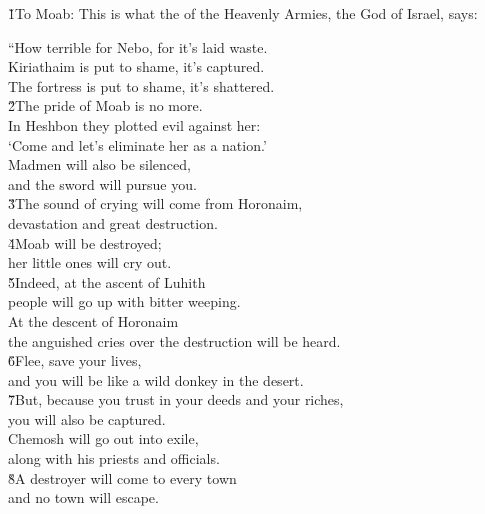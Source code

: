 \v{1}To Moab: This is what the  of the Heavenly Armies, the God of Israel, says:

\begin{poetry}
\poeml ``How terrible for Nebo, for it's laid waste. \\
\poemll    Kiriathaim is put to shame, it's captured. \\
\poemlll       The fortress is put to shame, it's shattered. \\
\poeml \v{2}The pride of Moab is no more. \\
\poemll    In Heshbon they plotted evil against her: \\
\poeml `Come and let's eliminate her as a nation.' \\
\poemll    Madmen will also be silenced, \\
\poemlll       and the sword will pursue you. \\
\poeml \v{3}The sound of crying will come from Horonaim, \\
\poemll    devastation and great destruction. \\
\poeml \v{4}Moab will be destroyed; \\
\poemll    her little ones will cry out. \\
\poeml \v{5}Indeed, at the ascent of Luhith \\
\poemll    people will go up with bitter weeping. \\
\poeml At the descent of Horonaim \\
\poemll    the anguished cries over the destruction will be heard. \\
\poeml \v{6}Flee, save your lives, \\
\poemll    and you will be like a wild donkey in the desert. \\
\poeml \v{7}But, because you trust in your deeds and your riches, \\
\poemll    you will also be captured. \\
\poeml Chemosh will go out into exile, \\
\poemll    along with his priests and officials. \\
\poeml \v{8}A destroyer will come to every town \\
\poemll    and no town will escape. \\

\end{poetry}
